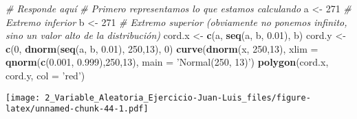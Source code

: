 \documentclass[
]{article}
\newenvironment{Shaded}{\begin{snugshade}}{\end{snugshade}}
\newcommand{\CommentTok}[1]{\textcolor[rgb]{0.56,0.35,0.01}{\textit{#1}}}
\newcommand{\DataTypeTok}[1]{\textcolor[rgb]{0.13,0.29,0.53}{#1}}
\newcommand{\DecValTok}[1]{\textcolor[rgb]{0.00,0.00,0.81}{#1}}
\newcommand{\FloatTok}[1]{\textcolor[rgb]{0.00,0.00,0.81}{#1}}
\newcommand{\KeywordTok}[1]{\textcolor[rgb]{0.13,0.29,0.53}{\textbf{#1}}}
\newcommand{\NormalTok}[1]{#1}
\newcommand{\StringTok}[1]{\textcolor[rgb]{0.31,0.60,0.02}{#1}}
\begin{document}
\begin{Shaded}
\begin{Highlighting}[]
\CommentTok{# Responde aquí}
\CommentTok{# Primero representamos lo que estamos calculando}
\NormalTok{a <-}\StringTok{ }\DecValTok{271} \CommentTok{# Extremo inferior}
\NormalTok{b <-}\StringTok{ }\DecValTok{271} \CommentTok{# Extremo superior (obviamente no ponemos infinito, sino un valor alto de la distribución)}
\NormalTok{cord.x <-}\StringTok{ }\KeywordTok{c}\NormalTok{(a, }\KeywordTok{seq}\NormalTok{(a, b, }\FloatTok{0.01}\NormalTok{), b) }
\NormalTok{cord.y <-}\StringTok{ }\KeywordTok{c}\NormalTok{(}\DecValTok{0}\NormalTok{, }\KeywordTok{dnorm}\NormalTok{(}\KeywordTok{seq}\NormalTok{(a, b, }\FloatTok{0.01}\NormalTok{), }\DecValTok{250}\NormalTok{,}\DecValTok{13}\NormalTok{), }\DecValTok{0}\NormalTok{) }
\KeywordTok{curve}\NormalTok{(}\KeywordTok{dnorm}\NormalTok{(x, }\DecValTok{250}\NormalTok{,}\DecValTok{13}\NormalTok{), }\DataTypeTok{xlim =} \KeywordTok{qnorm}\NormalTok{(}\KeywordTok{c}\NormalTok{(}\FloatTok{0.001}\NormalTok{, }\FloatTok{0.999}\NormalTok{),}\DecValTok{250}\NormalTok{,}\DecValTok{13}\NormalTok{), }\DataTypeTok{main =} \StringTok{'Normal(250, 13)'}\NormalTok{) }
\KeywordTok{polygon}\NormalTok{(cord.x, cord.y, }\DataTypeTok{col =} \StringTok{'red'}\NormalTok{)}
\end{Highlighting}
\end{Shaded}

\texttt{[image: 2\_Variable\_Aleatoria\_Ejercicio-Juan-Luis\_files/figure-latex/unnamed-chunk-44-1.pdf]}
\end{document}
